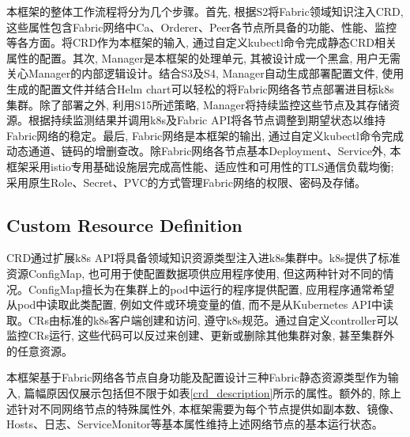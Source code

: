 本框架的整体工作流程将分为几个步骤。首先, 根据S2将Fabric领域知识注入CRD, 这些属性包含Fabric网络中Ca、Orderer、Peer各节点所具备的功能、性能、监控等各方面。将CRD作为本框架的输入, 通过自定义kubectl命令完成静态CRD相关属性的配置。其次, Manager是本框架的处理单元, 其被设计成一个黑盒\cite{yu2020system}, 用户无需关心Manager的内部逻辑设计。结合S3及S4, Manager自动生成部署配置文件, 使用生成的配置文件并结合Helm chart可以轻松的将Fabric网络各节点部署进目标k8s集群。除了部署之外, 利用S15所述策略,   Manager将持续监控这些节点及其存储资源。根据持续监测结果并调用k8s及Fabric API将各节点调整到期望状态以维持Fabric网络的稳定。最后, Fabric网络是本框架的输出, 通过自定义kubectl命令完成动态通道、链码的增删查改。除Fabric网络各节点基本Deployment、Service外, 本框架采用istio专用基础设施层完成高性能、适应性和可用性\cite{li2019service}\cite{larsson2020impact}的TLS通信负载均衡; 采用原生Role、Secret、PVC的方式管理Fabric网络的权限、密码及存储。

\subsection{Custom Resource Definition}\label{section: Custom_Resource_Definition}

CRD通过扩展k8s API将具备领域知识资源类型注入进k8s集群中。k8s提供了标准资源ConfigMap, 也可用于使配置数据项供应用程序使用, 但这两种针对不同的情况。ConfigMap擅长为在集群上的pod中运行的程序提供配置, 应用程序通常希望从pod中读取此类配置, 例如文件或环境变量的值, 而不是从Kubernetes API中读取。CRs由标准的k8s客户端创建和访问, 遵守k8s规范。通过自定义controller可以监控CRs运行, 这些代码可以反过来创建、更新或删除其他集群对象, 甚至集群外的任意资源。

本框架基于Fabric网络各节点自身功能及配置\footnotemark[1]\footnotemark[2]\footnotemark[3]设计三种Fabric静态资源类型作为输入, 篇幅原因仅展示包括但不限于如表\ref{crd_description}所示的属性。额外的, 除上述针对不同网络节点的特殊属性外, 本框架需要为每个节点提供如副本数、镜像、Hosts、日志、ServiceMonitor等基本属性维持上述网络节点的基本运行状态。


